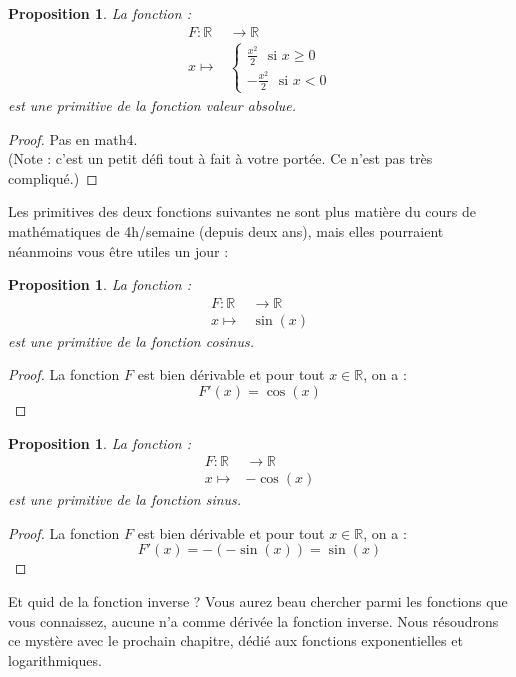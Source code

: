 \documentclass[a4paper,fontsize=13pt]{scrreprt}
\theoremstyle{plain}
\newtheorem{pro}[subsection]{Proposition}
\theoremstyle{definition}
\newcommand{\rr}{\mathbb{R}}
\begin{document}
\begin{pro}
La fonction :
\begin{align*}
F : \rr &\to \rr \\
x \mapsto& \begin{cases}\frac{x^2}{2} \mbox{~~si~} x \ge 0 \\ -\frac{x^2}{2} \mbox{~~si~} x < 0\end{cases}
\end{align*}
est une primitive de la fonction valeur absolue.
\end{pro}
\begin{proof}
Pas en math4.\\
(Note : c'est un petit défi tout à fait à votre portée. Ce n'est pas très compliqué.)
\end{proof}
Les primitives des deux fonctions suivantes ne sont plus matière du cours de mathématiques de 4h/semaine (depuis deux ans), mais elles pourraient néanmoins vous être utiles un jour :
\begin{pro}
La fonction :
\begin{align*}
F : \rr &\to \rr \\
x \mapsto& \sin(x)
\end{align*}
est une primitive de la fonction cosinus.
\end{pro}
\begin{proof}
La fonction $F$ est bien dérivable et pour tout $x\in \rr$, on a :
$$F'(x) = \cos(x)$$ 
\end{proof}
\begin{pro}
La fonction :
\begin{align*}
F : \rr &\to \rr \\
x \mapsto& -\cos(x)
\end{align*}
est une primitive de la fonction sinus.
\end{pro}
\begin{proof}
La fonction $F$ est bien dérivable et pour tout $x\in \rr$, on a :
$$F'(x) = -(-\sin(x))=\sin(x)$$ 
\end{proof}

Et quid de la fonction inverse ? Vous aurez beau chercher parmi les fonctions que vous connaissez, aucune n'a comme dérivée la fonction inverse. Nous résoudrons ce mystère avec le prochain chapitre, dédié aux fonctions exponentielles et logarithmiques.
\end{document}
